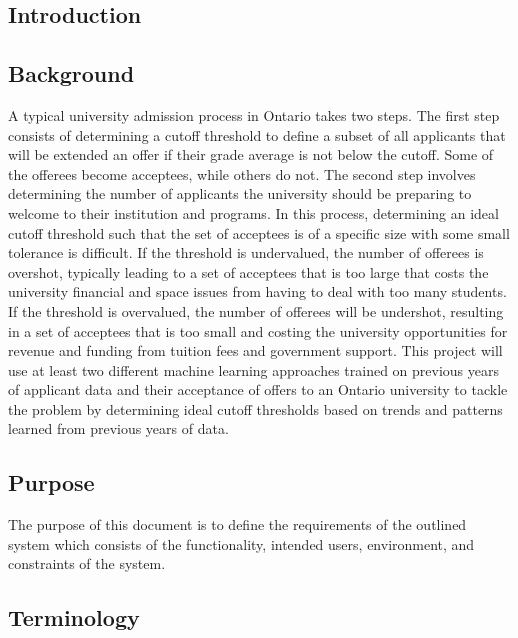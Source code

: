 \documentclass{article}
\begin{document}
	\newpage
    \begin{normalsize}
    \tableofcontents
    \newpage
    
    \section{Introduction}

    \subsection{Background}
    A typical university admission process in Ontario takes two steps.
    The first step consists of determining a cutoff threshold to define a subset of all applicants that will be extended an offer if their grade average is not below the cutoff. Some of the offerees become acceptees, while others do not. The second step involves determining the number of applicants the university should be preparing to welcome to their institution and programs. \newline
    \indent In this process, determining an ideal cutoff threshold such that the set of acceptees is of a specific size with some small tolerance is difficult. If the threshold is undervalued, the number of offerees is overshot, typically leading to a set of acceptees that is too large that costs the university financial and space issues from having to deal with too many students.
    If the threshold is overvalued, the number of offerees will be undershot, resulting in a set of acceptees that is too small and costing the university opportunities for revenue and funding from tuition fees and government support. \newline
    \indent This project will use at least two different machine learning approaches trained on previous years of applicant data and their acceptance of offers to an Ontario university to tackle the problem by determining ideal cutoff thresholds based on trends and patterns learned from previous years of data.
    
    \subsection{Purpose}
    	The purpose of this document is to define the requirements of the outlined system which consists of the functionality, intended users, environment, and constraints of the system.
    
    \subsection{Terminology}

\end{normalsize}
\end{document}
